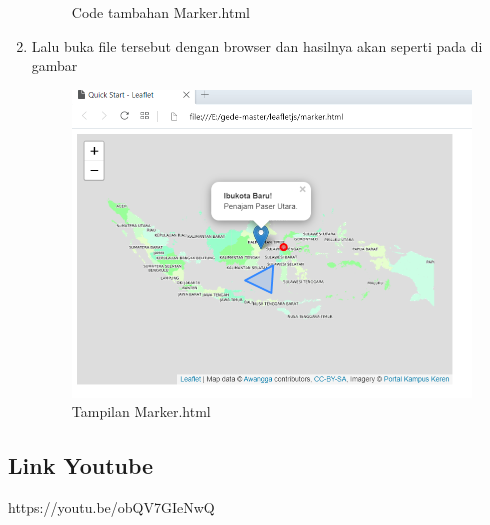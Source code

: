 \begin{enumerate}
\begin{figure}[H]
		\centering
		\caption{Code tambahan Marker.html}
	\end{figure}
    \item Lalu buka file tersebut dengan browser dan hasilnya akan seperti pada di gambar
    \hfill\break
    \begin{figure}[H]
		\includegraphics[width=12cm]{figures/Tugas5/1174084/5.png}
		\centering
		\caption{Tampilan Marker.html}
	\end{figure}
\end{enumerate}
\subsection{Link Youtube}
https://youtu.be/obQV7GIeNwQ